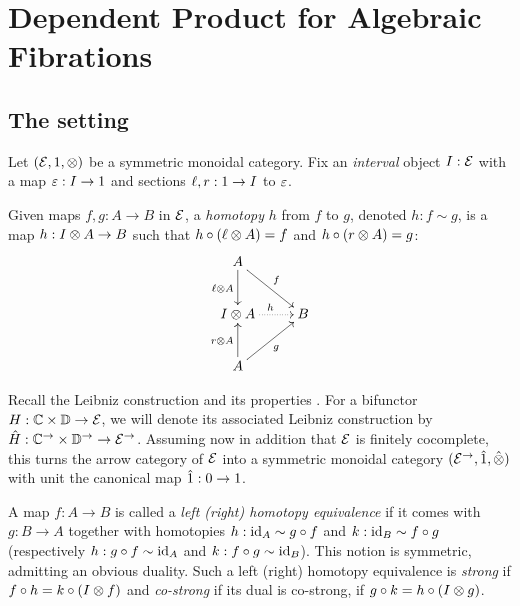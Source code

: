 \documentclass[reqno,10pt,a4paper,oneside]{amsart}
\begin{document}
\section{Dependent Product for Algebraic Fibrations}

\subsection{The setting}

Let $(\mathcal{E}, 1, \otimes)$ be a symmetric monoidal category.
Fix an \emph{interval} object $I : \mathcal{E}$ with a map $\varepsilon : I \to 1$ and sections $\ell, r : 1 \to I$ to $\varepsilon$.

\begin{definition}
\label{def:homotopy}
Given maps $f, g : A \to B$ in $\mathcal{E}$, a \emph{homotopy} $h$ from $f$ to $g$, denoted $h : f \sim g$, is a map $h : I \otimes A \to B$ such that $h \mathbin{\circ} (\ell \otimes A) = f$ and $h \mathbin{\circ} (r \otimes A) = g$:
\[
\xymatrix{
  A
  \ar[dr]^{f}
  \ar[d]_{\intervall \otimes A}
\\
  \interval \otimes A
  \ar@{.>}[r]^{h}
&
  B
\\
  A
  \ar[u]^{\intervalr \otimes A}
  \ar[ur]_{g}
}
\]
\end{definition}

Recall the Leibniz construction and its properties \cite[Section 4]{riehl-verity:reedy}.
For a bifunctor $H : \mathbb{C} \times \mathbb{D} \to \mathcal{E}$, we will denote its associated Leibniz construction by $\hat{H} : \mathbb{C}^{\to} \times \mathbb{D}^{\to} \to \mathcal{E}^{\to}$.
Assuming now in addition that $\mathcal{E}$ is finitely cocomplete, this turns the arrow category of $\mathcal{E}$ into a symmetric monoidal category $(\mathcal{E}^{\to}, \hat{1}, \mathbin{\hat{\otimes}})$ with unit the canonical map $\hat{1} : 0 \to 1$.

\begin{definition}
\label{def:homotopy-equivalence}
A map $f : A \to B$ is called a \emph{left (right) homotopy equivalence} if it comes with $g : B \to A$ together with homotopies $h : \operatorname{id}_A \sim g \mathbin{\circ} f$ and $k : \operatorname{id}_B \sim f \mathbin{\circ} g$ (respectively $h : g \mathbin{\circ} f \sim \operatorname{id}_A$ and $k : f \mathbin{\circ} g \sim \operatorname{id}_B$).
This notion is symmetric, admitting an obvious duality.
Such a left (right) homotopy equivalence is \emph{strong} if $f \mathbin{\circ} h = k \mathbin{\circ} (I \otimes f)$ and \emph{co-strong} if its dual is co-strong, \ie if $g \mathbin{\circ} k = h \mathbin{\circ} (I \otimes g)$.
%
\end{definition}
\end{document}
